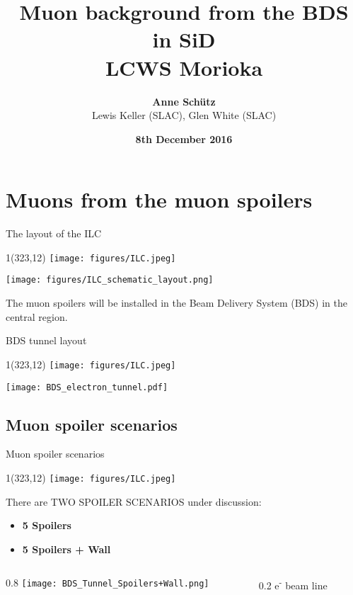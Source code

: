 \documentclass[xcolor={dvipsnames}]{beamer}
\title[ILC \& Muons from spoilers]{\textbf{\LARGE Muon background from the BDS\\in SiD} \\ \vspace*{0.3cm} \small LCWS Morioka}
\author[Anne Sch\"utz]{\textbf{Anne Sch\"utz}\\Lewis Keller (SLAC), Glen White (SLAC)}
\institute{\textbf{DESY}}
\date{\textbf{8th December 2016}}
\newcommand{\ilclogo}{
  \setlength{\TPHorizModule}{1pt}
  \setlength{\TPVertModule}{1pt}
  \begin{textblock}{1}(323,12)
   \texttt{[image: figures/ILC.jpeg]}
  \end{textblock}
}
\begin{document}
{
\begin{frame}
  \titlepage
\end{frame}
}
\begin{frame}
  \tableofcontents
\end{frame}

\section{Muons from the muon spoilers}
\begin{frame}{The layout of the ILC}
\ilclogo
\begin{center}
\texttt{[image: figures/ILC\_schematic\_layout.png]}
\end{center}
The muon spoilers will be installed in the Beam Delivery System (BDS) in the central region.
\end{frame}

\begin{frame}{BDS tunnel layout}
\ilclogo
\begin{center}
\texttt{[image: BDS\_electron\_tunnel.pdf]}
\end{center}
\end{frame}

\subsection{Muon spoiler scenarios}
\begin{frame}{Muon spoiler scenarios}
\ilclogo
There are TWO SPOILER SCENARIOS under discussion:
\begin{itemize}
 \item \textbf{5 Spoilers}
 \item \textbf{5 Spoilers + Wall}
\end{itemize}

\begin{columns}[b]
 \begin{column}{0.8\textwidth}
 \flushright
\texttt{[image: BDS\_Tunnel\_Spoilers+Wall.png]}
\end{column}
 \begin{column}{0.2\textwidth}
 \flushleft
e\textsuperscript{-} beam line
\vspace*{0.55cm}
\end{column}
\end{columns}
\end{frame}
\end{document}
